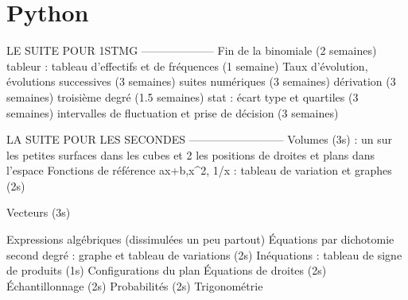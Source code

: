\part{Python}


%







\printnomenclature

\printindex




LE SUITE POUR 1STMG
--------------------
Fin de la binomiale (2 semaines)
tableur : tableau d'effectifs et de fréquences  (1 semaine)
Taux d'évolution, évolutions successives    (3 semaines)
suites numériques   (3 semaines)
dérivation  (3 semaines)
troisième degré (1.5 semaines)
stat : écart type et quartiles  (3 semaines)
intervalles de fluctuation et prise de décision (3 semaines)

LA SUITE POUR LES SECONDES
--------------------------
Volumes (3s) : un sur les petites surfaces dans les cubes et 2 les positions de droites et plans dans l'espace
Fonctions de référence ax+b,x^2, 1/x : tableau de variation et graphes (2s)

Vecteurs (3s)

Expressions algébriques (dissimulées un peu partout)
Équations par dichotomie
second degré : graphe et tableau de variations (2s)
Inéquations : tableau de signe de produits (1s)
Configurations du plan 
Équations de droites (2s)
Échantillonnage (2s)
Probabilités (2s)
Trigonométrie
